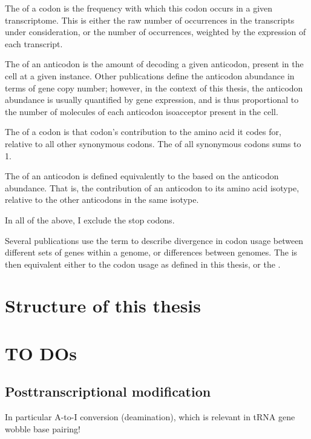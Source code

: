 The  of a codon is the frequency with which this codon
occurs in a given transcriptome. This is either the raw number of occurrences in
the transcripts under consideration, or the number of occurrences, weighted by
the expression of each transcript.

The  of an anticodon is the amount of \trna
decoding a given anticodon, present in the cell at a given instance. Other
publications define the anticodon abundance in terms of \trna gene copy number;
however, in the context of this thesis, the anticodon abundance is usually
quantified by \trna gene expression, and is thus proportional to the number of
\trna molecules of each anticodon isoacceptor present in the cell.

The  of a codon is that codon’s contribution to the amino acid it
codes for, relative to all other synonymous codons. The \rcu of all synonymous
codons sums to \num{1}.

The  of an anticodon is defined equivalently to the \rcu based on
the anticodon abundance. That is, the contribution of an anticodon to its amino
acid isotype, relative to the other anticodons in the same isotype.

In all of the above, I exclude the stop codons.

Several publications use the term \cub to describe divergence in codon usage
between different sets of genes within a genome, or differences between genomes.
The \cub is then equivalent either to the codon usage as defined in this thesis,
or the \rcu.

\section{Structure of this thesis}

\section{TO DOs}



\subsection{Posttranscriptional modification}

In particular A-to-I conversion (deamination), which is relevant in tRNA gene
wobble base pairing!
